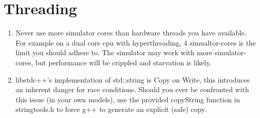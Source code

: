 \section{Threading}
\begin{enumerate}
\item Never use more simulator cores than hardware threads you have available. For example on a dual core cpu with hyperthreading, 4 simualtor-cores is the limit you should adhere to. The simulator may work with more simulator-cores, but performance will be crippled and starvation is likely.
\item libstdc++'s implementation of std::string is Copy on Write, this introduces an inherent danger for race conditions. Should you ever be confronted with this issue (in your own models), use the provided copyString function in stringtools.h to force g++ to generate an explicit (safe) copy.
\end{enumerate}